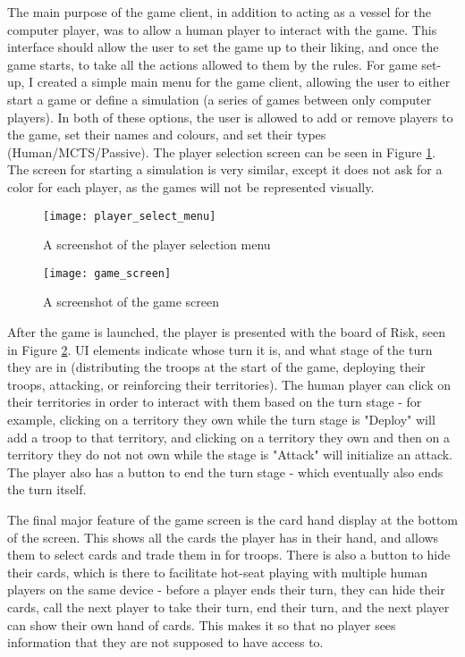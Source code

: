The main purpose of the game client, in addition to acting as a vessel for the computer player, was to allow a human player to interact with the game. This interface should allow the user to set the game up to their liking, and once the game starts, to take all the actions allowed to them by the rules. For game set-up, I created a simple main menu for the game client, allowing the user to either start a game or define a simulation (a series of games between only computer players). In both of these options, the user is allowed to add or remove players to the game, set their names and colours, and set their types (Human/MCTS/Passive). The player selection screen can be seen in Figure \ref{fig:PlayerSelectMenu}. The screen for starting a simulation is very similar, except it does not ask for a color for each player, as the games will not be represented visually.


\begin{figure}[H]
\texttt{[image: player\_select\_menu]}
\caption{A screenshot of the player selection menu}
\label{fig:PlayerSelectMenu}
\end{figure}

\begin{figure}[H]
\texttt{[image: game\_screen]}
\caption{A screenshot of the game screen}
\label{fig:GameScreen}
\end{figure}

After the game is launched, the player is presented with the board of Risk, seen in Figure \ref{fig:GameScreen}. UI elements indicate whose turn it is, and what stage of the turn they are in (distributing the troops at the start of the game, deploying their troops, attacking, or reinforcing their territories). The human player can click on their territories in order to interact with them based on the turn stage - for example, clicking on a territory they own while the turn stage is "Deploy" will add a troop to that territory, and clicking on a territory they own and then on a territory they do not not own while the stage is "Attack" will initialize an attack. The player also has a button to end the turn stage - which eventually also ends the turn itself.

The final major feature of the game screen is the card hand display at the bottom of the screen. This shows all the cards the player has in their hand, and allows them to select cards and trade them in for troops. There is also a button to hide their cards, which is there to facilitate hot-seat playing with multiple human players on the same device - before a player ends their turn, they can hide their cards, call the next player to take their turn, end their turn, and the next player can show their own hand of cards. This makes it so that no player sees information that they are not supposed to have access to.

